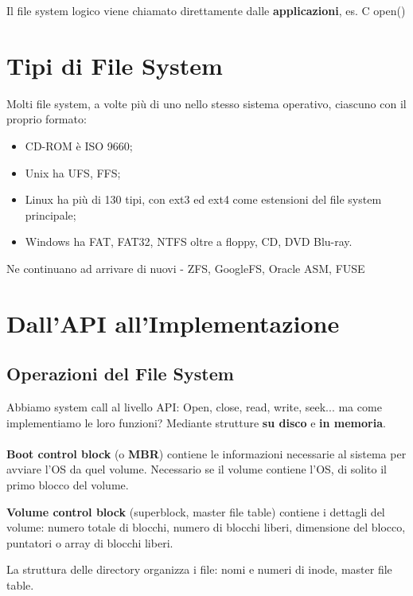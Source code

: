 Il file system logico viene chiamato direttamente dalle \textbf{applicazioni}, es. C open()






\section{Tipi di File System}

Molti file system, a volte più di uno nello stesso sistema operativo, ciascuno con il proprio formato:
\begin{itemize}
  \item CD-ROM è ISO 9660;
  \item Unix ha UFS, FFS;
  \item Linux ha più di 130 tipi, con ext3 ed ext4 come estensioni del file system principale;
  \item Windows ha FAT, FAT32, NTFS oltre a floppy, CD, DVD Blu-ray.
\end{itemize}

Ne continuano ad arrivare di nuovi - ZFS, GoogleFS, Oracle ASM, FUSE


\section{Dall'API all'Implementazione}

\subsection{Operazioni del File System}

Abbiamo system call al livello API: Open, close, read, write, seek... ma come implementiamo le loro funzioni? Mediante strutture \textbf{su disco} e \textbf{in memoria}.

\paragraph{}
\textbf{Boot control block} (o \textbf{MBR}) contiene le informazioni necessarie al sistema per avviare l'OS da quel volume. Necessario se il volume contiene l'OS, di solito il primo blocco del volume.

\textbf{Volume control block} (superblock, master file table) contiene i dettagli del volume: numero totale di blocchi, numero di blocchi liberi, dimensione del blocco, puntatori o array di blocchi liberi.

La struttura delle directory organizza i file: nomi e numeri di inode, master file table.

